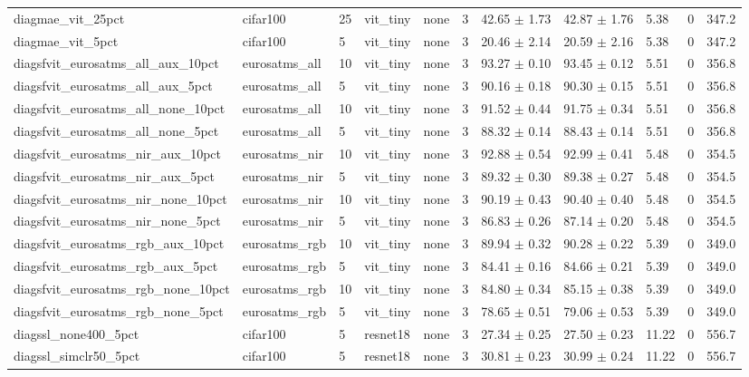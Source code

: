 \begin{tabular}{lllllllllll}
diagmae_vit_25pct & cifar100 & 25 & vit_tiny & none & 3 & 42.65 $\pm$ 1.73 & 42.87 $\pm$ 1.76 & 5.38 & 0 & 347.2 \\
diagmae_vit_5pct & cifar100 & 5 & vit_tiny & none & 3 & 20.46 $\pm$ 2.14 & 20.59 $\pm$ 2.16 & 5.38 & 0 & 347.2 \\
diagsfvit_eurosatms_all_aux_10pct & eurosatms_all & 10 & vit_tiny & none & 3 & 93.27 $\pm$ 0.10 & 93.45 $\pm$ 0.12 & 5.51 & 0 & 356.8 \\
diagsfvit_eurosatms_all_aux_5pct & eurosatms_all & 5 & vit_tiny & none & 3 & 90.16 $\pm$ 0.18 & 90.30 $\pm$ 0.15 & 5.51 & 0 & 356.8 \\
diagsfvit_eurosatms_all_none_10pct & eurosatms_all & 10 & vit_tiny & none & 3 & 91.52 $\pm$ 0.44 & 91.75 $\pm$ 0.34 & 5.51 & 0 & 356.8 \\
diagsfvit_eurosatms_all_none_5pct & eurosatms_all & 5 & vit_tiny & none & 3 & 88.32 $\pm$ 0.14 & 88.43 $\pm$ 0.14 & 5.51 & 0 & 356.8 \\
diagsfvit_eurosatms_nir_aux_10pct & eurosatms_nir & 10 & vit_tiny & none & 3 & 92.88 $\pm$ 0.54 & 92.99 $\pm$ 0.41 & 5.48 & 0 & 354.5 \\
diagsfvit_eurosatms_nir_aux_5pct & eurosatms_nir & 5 & vit_tiny & none & 3 & 89.32 $\pm$ 0.30 & 89.38 $\pm$ 0.27 & 5.48 & 0 & 354.5 \\
diagsfvit_eurosatms_nir_none_10pct & eurosatms_nir & 10 & vit_tiny & none & 3 & 90.19 $\pm$ 0.43 & 90.40 $\pm$ 0.40 & 5.48 & 0 & 354.5 \\
diagsfvit_eurosatms_nir_none_5pct & eurosatms_nir & 5 & vit_tiny & none & 3 & 86.83 $\pm$ 0.26 & 87.14 $\pm$ 0.20 & 5.48 & 0 & 354.5 \\
diagsfvit_eurosatms_rgb_aux_10pct & eurosatms_rgb & 10 & vit_tiny & none & 3 & 89.94 $\pm$ 0.32 & 90.28 $\pm$ 0.22 & 5.39 & 0 & 349.0 \\
diagsfvit_eurosatms_rgb_aux_5pct & eurosatms_rgb & 5 & vit_tiny & none & 3 & 84.41 $\pm$ 0.16 & 84.66 $\pm$ 0.21 & 5.39 & 0 & 349.0 \\
diagsfvit_eurosatms_rgb_none_10pct & eurosatms_rgb & 10 & vit_tiny & none & 3 & 84.80 $\pm$ 0.34 & 85.15 $\pm$ 0.38 & 5.39 & 0 & 349.0 \\
diagsfvit_eurosatms_rgb_none_5pct & eurosatms_rgb & 5 & vit_tiny & none & 3 & 78.65 $\pm$ 0.51 & 79.06 $\pm$ 0.53 & 5.39 & 0 & 349.0 \\
diagssl_none400_5pct & cifar100 & 5 & resnet18 & none & 3 & 27.34 $\pm$ 0.25 & 27.50 $\pm$ 0.23 & 11.22 & 0 & 556.7 \\
diagssl_simclr50_5pct & cifar100 & 5 & resnet18 & none & 3 & 30.81 $\pm$ 0.23 & 30.99 $\pm$ 0.24 & 11.22 & 0 & 556.7 \\

\end{tabular}
